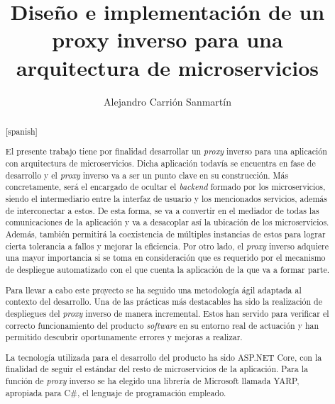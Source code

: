 \documentclass[11pt,spanish,listoffigures]{tfgetsinf}
\title{Diseño e implementación de un proxy inverso para una arquitectura de microservicios}
\author{Alejandro Carrión Sanmartín}
\begin{document}

\begin{abstract}[spanish]

El presente trabajo tiene por finalidad desarrollar un \emph{proxy} inverso para una aplicación con arquitectura de microservicios. Dicha aplicación todavía se encuentra en fase de desarrollo y el \emph{proxy} inverso va a ser un punto clave en su construcción. Más concretamente, será el encargado de ocultar el \emph{backend} formado por los microservicios, siendo el intermediario entre la interfaz de usuario y los mencionados servicios, además de interconectar a estos. De esta forma, se va a convertir en el mediador de todas las comunicaciones de la aplicación y va a desacoplar así la ubicación de los microservicios. Además, también permitirá la coexistencia de múltiples instancias de estos para lograr cierta tolerancia a fallos y mejorar la eficiencia. Por otro lado, el \emph{proxy} inverso adquiere una mayor importancia si se toma en consideración que es requerido por el mecanismo de despliegue automatizado con el que cuenta la aplicación de la que va a formar parte.

Para llevar a cabo este proyecto se ha seguido una metodología ágil adaptada al contexto del desarrollo. Una de las prácticas más destacables ha sido la realización de despliegues del \emph{proxy} inverso de manera incremental. Estos han servido para verificar el correcto funcionamiento del producto \emph{software} en su entorno real de actuación y han permitido descubrir oportunamente errores y mejoras a realizar.

La tecnología utilizada para el desarrollo del producto ha sido ASP.NET Core, con la finalidad de seguir el estándar del resto de microservicios de la aplicación. Para la función de \emph{proxy} inverso se ha elegido una librería de Microsoft llamada YARP, apropiada para C\#, el lenguaje de programación empleado.

\end{abstract}
\end{document}
